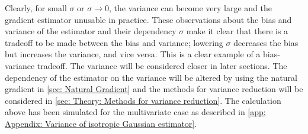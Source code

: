Clearly, for small $\sigma$ or $\sigma\rightarrow0$, the variance can become very large and the gradient estimator unusable in practice. These observations about the bias and variance of the estimator and their dependency $\sigma$ make it clear that there is a tradeoff to be made between the bias and variance; lowering $\sigma$ decreases the bias but increases the variance, and vice versa. This is a clear example of a bias-variance tradeoff. 
The variance will be considered closer in later sections. The dependency of the estimator on the variance will be altered by using the natural gradient in \autoref{sec: Natural Gradient} and the methods for variance reduction will be considered in \autoref{sec: Theory: Methods for variance reduction}. The calculation above has been simulated for the multivariate case as described in \autoref{app: Appendix: Variance of isotropic Gaussian estimator}.





\iffalse

(Does this hold?)
For the Gaussian distribution, this number will be very small.
Lagrange's form of the Taylor series remainder after $n$ terms is given by
\begin{equation}
O(\epsilon^n) = \frac{f^{(n)}(\xi)\epsilon^n}{n!}
\end{equation}
where $\xi\in[x, x+\epsilon]$ ($\xi\sim\mathcal{N}(x,\epsilon)$ ?? ). 

The expectation of this remainder for the specific case of $n=4$ and $\epsilon\sim\mathcal{N}(0,\sigma^2)$ takes the following form.
\begin{align*}
\text{E}[O(\epsilon^4)] &= \text{E}\left[\frac{f^{(4)}(\xi)\epsilon^4}{4!}\right]\nonumber\\
&= \frac{1}{4!}\text{E}\left[f^{(4)}(\xi)\right]\text{E}\left[\epsilon^4\right] + \text{Cov}\left[f^{(4)}(\xi),\epsilon^4\right]\nonumber\\
&= \frac{3\sigma^4}{24}\text{E}\left[f^{(4)}(\xi)\right] + \text{Cov}\left[f^{(4)}(\xi),\epsilon^4\right]\nonumber\\
\end{align*}
\fi




